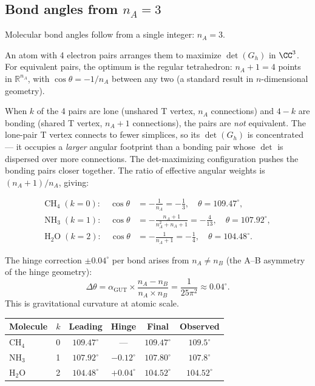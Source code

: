 \subsection{Bond angles from $n_A = 3$}

Molecular bond angles follow from a single integer: $n_A = 3$.

An atom with 4 electron pairs arranges them to maximize $\det(G_h)$ in $\CC^3$. For equivalent pairs, the optimum is the regular tetrahedron: $n_A + 1 = 4$ points in $\mathbb{R}^{n_A}$, with $\cos\theta = -1/n_A$ between any two (a standard result in $n$-dimensional geometry).

When $k$ of the 4 pairs are lone (unshared T vertex, $n_A$ connections) and $4-k$ are bonding (shared T vertex, $n_A + 1$ connections), the pairs are \emph{not} equivalent. The lone-pair T vertex connects to fewer simplices, so its $\det(G_h)$ is concentrated --- it occupies a \emph{larger} angular footprint than a bonding pair whose $\det$ is dispersed over more connections. The det-maximizing configuration pushes the bonding pairs closer together. The ratio of effective angular weights is $(n_A + 1)/n_A$, giving:

\begin{theorem}
\begin{align}
\text{CH}_4 \;(k=0): \quad \cos\theta &= -\frac{1}{n_A} = -\frac{1}{3}, \quad \theta = 109.47^\circ, \\[4pt]
\text{NH}_3 \;(k=1): \quad \cos\theta &= -\frac{n_A + 1}{n_A^2 + n_A + 1} = -\frac{4}{13}, \quad \theta = 107.92^\circ, \\[4pt]
\text{H}_2\text{O} \;(k=2): \quad \cos\theta &= -\frac{1}{n_A + 1} = -\frac{1}{4}, \quad \theta = 104.48^\circ.
\end{align}
\end{theorem}

The hinge correction $\pm 0.04^\circ$ per bond arises from $n_A \neq n_B$ (the A--B asymmetry of the hinge geometry):
\begin{equation}
\Delta\theta = \alpha_\text{GUT} \times \frac{n_A - n_B}{n_A \times n_B} = \frac{1}{25\pi^2} \approx 0.04^\circ.
\end{equation}
This is gravitational curvature at atomic scale.

\begin{center}
\begin{tabular}{lccccc}
\hline
Molecule & $k$ & Leading & Hinge & Final & Observed \\
\hline
CH$_4$ & 0 & $109.47^\circ$ & --- & $109.47^\circ$ & $109.5^\circ$ \\
NH$_3$ & 1 & $107.92^\circ$ & $-0.12^\circ$ & $107.80^\circ$ & $107.8^\circ$ \\
H$_2$O & 2 & $104.48^\circ$ & $+0.04^\circ$ & $104.52^\circ$ & $104.52^\circ$ \\
\hline
\end{tabular}
\end{center}

